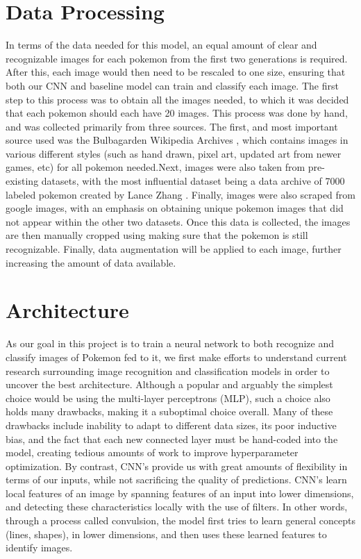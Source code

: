 \documentclass{article} %
\begin{document}
\section{Data Processing}

In terms of the data needed for this model, an equal amount of clear and recognizable images for each pokemon from the first two generations is required. After this, each image would then need to be rescaled to one size, ensuring that both our CNN and baseline model can train and classify each image. The first step to this process was to obtain all the images needed, to which it was decided that each pokemon should each have 20 images. This process was done by hand, and was collected primarily from three sources. The first, and most important source used was the Bulbagarden Wikipedia Archives \citep{bulbagarden_archives}, which contains images in various different styles (such as hand drawn, pixel art, updated art from newer games, etc) for all pokemon needed.Next, images were also taken from pre-existing datasets, with the most influential dataset being a data archive of 7000 labeled pokemon created by Lance Zhang \citep{Kaggle}. Finally, images were also scraped from google images, with an emphasis on obtaining unique pokemon images that did not appear within the other two datasets. Once this data is collected, the images are then manually cropped using making sure that the pokemon is still recognizable. Finally, data augmentation will be applied to each image, further increasing the amount of data available. 

\section {Architecture}

As our goal in this project is to train a neural network to both recognize and classify images of Pokemon fed to it, we first make efforts to understand current research surrounding image recognition and classification models in order to uncover the best architecture. Although a popular and arguably the simplest choice would be using the multi-layer perceptrons (MLP), such a choice also holds many drawbacks, making it a suboptimal choice overall. Many of these drawbacks include inability to adapt to different data sizes, its poor inductive bias, and the fact that each new connected layer must be hand-coded into the model, creating tedious amounts of work to improve hyperparameter optimization. By contrast, CNN's provide us with great amounts of flexibility in terms of our inputs, while not sacrificing the quality of predictions. CNN's learn local features of an image by spanning features of an input into lower dimensions, and detecting these characteristics locally with the use of filters. In other words, through a process called convulsion, the model first tries to learn general concepts (lines, shapes), in lower dimensions, and then uses these learned features to identify images. 
\end{document}
